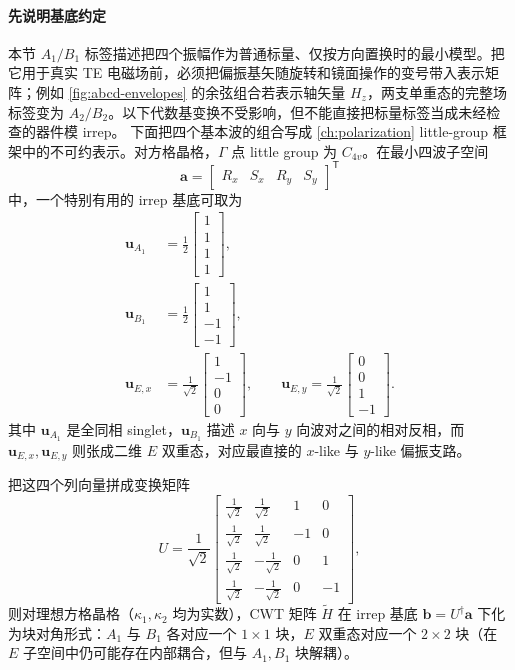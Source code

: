 \paragraph{先说明基底约定}
本节 $A_1/B_1$ 标签描述把四个振幅作为普通标量、仅按方向置换时的最小模型。把它用于真实 TE 电磁场前，必须把偏振基矢随旋转和镜面操作的变号带入表示矩阵；例如 \cref{fig:abcd-envelopes} 的余弦组合若表示轴矢量 $H_z$，两支单重态的完整场标签变为 $A_2/B_2$。以下代数基变换不受影响，但不能直接把标量标签当成未经检查的器件模 irrep。
下面把四个基本波的组合写成 \cref{ch:polarization} little-group 框架中的不可约表示。对方格晶格，$\Gamma$ 点 little group 为 $C_{4v}$。在最小四波子空间
\[
\bm{a}=
\begin{bmatrix}
R_x & S_x & R_y & S_y
\end{bmatrix}^{\mathsf T}
\]
中，一个特别有用的 irrep 基底可取为
\begin{align}
\bm{u}_{A_1}
&=
\frac{1}{2}
\begin{bmatrix}
1\\1\\1\\1
\end{bmatrix},
\label{eq:cwt_A1_basis}
\\
\bm{u}_{B_1}
&=
\frac{1}{2}
\begin{bmatrix}
1\\1\\-1\\-1
\end{bmatrix},
\label{eq:cwt_B1_basis}
\\
\bm{u}_{E,x}
&=
\frac{1}{\sqrt{2}}
\begin{bmatrix}
1\\-1\\0\\0
\end{bmatrix},
\qquad
\bm{u}_{E,y}
=
\frac{1}{\sqrt{2}}
\begin{bmatrix}
0\\0\\1\\-1
\end{bmatrix}.
\label{eq:cwt_E_basis}
\end{align}
其中 $\bm{u}_{A_1}$ 是全同相 singlet，$\bm{u}_{B_1}$ 描述 $x$ 向与 $y$ 向波对之间的相对反相，而 $\bm{u}_{E,x},\bm{u}_{E,y}$ 则张成二维 $E$ 双重态，对应最直接的 $x$-like 与 $y$-like 偏振支路。

把这四个列向量拼成变换矩阵
\begin{equation}
U = \frac{1}{\sqrt{2}}
\begin{bmatrix}
\frac{1}{\sqrt{2}} & \frac{1}{\sqrt{2}} & 1 & 0 \\
\frac{1}{\sqrt{2}} & \frac{1}{\sqrt{2}} & -1 & 0 \\
\frac{1}{\sqrt{2}} & -\frac{1}{\sqrt{2}} & 0 & 1 \\
\frac{1}{\sqrt{2}} & -\frac{1}{\sqrt{2}} & 0 & -1
\end{bmatrix},
\label{eq:cwt_U_matrix}
\end{equation}
则对理想方格晶格（$\kappa_1,\kappa_2$ 均为实数），CWT 矩阵 $\tilde H$ 在 irrep 基底 $\bm{b}=U^\dagger\bm{a}$ 下化为块对角形式：$A_1$ 与 $B_1$ 各对应一个 $1\times1$ 块，$E$ 双重态对应一个 $2\times2$ 块（在 $E$ 子空间中仍可能存在内部耦合，但与 $A_1,B_1$ 块解耦）。

